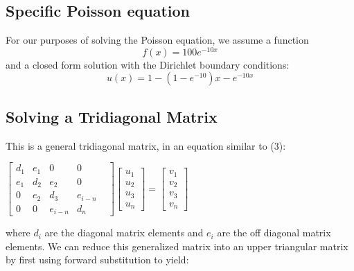 \documentclass[10pt,showpacs,preprintnumbers,footinbib,amsmath,amssymb,aps,prl,twocolumn,groupedaddress,superscriptaddress,showkeys]{revtex4-1}
\begin{document}
	\subsection{Specific Poisson equation}	
For our purposes of solving the Poisson equation, we assume a function \begin{equation}
	f(x)=100e^{-10x}
	\end{equation}
and a closed form solution with the Dirichlet boundary conditions:
	\begin{equation}
	u(x)=1-(1-e^{-10})x-e^{-10x}
	\end{equation}

	\subsection{Solving a Tridiagonal Matrix}
This is a general tridiagonal matrix, in an equation similar to (3):
	\begin{center}
		$\begin{bmatrix}
			d_{1}& e_{1} & 0 & 0 \\
			e_{1} & d_{2} & e_{2} & 0 & \\
			0 & e_{2} & d_{3} & e_{i-n}   \\
			0 & 0 & e_{i-n} & d_{n} 
	
		\end{bmatrix}
		 \begin{bmatrix}
			u_{1} \\
			u_{2} \\
			u_{3} \\
			u_{n} 
		\end{bmatrix} =
		\begin{bmatrix}
			v_{1} \\
			v_{2} \\
			v_{3} \\
			v_{n}
		\end{bmatrix}$
		\end{center}

where $d_{i}$ are the diagonal matrix elements and $e_{i}$ are the off diagonal matrix elements. We can reduce this generalized matrix into an upper triangular matrix by first using forward substitution to yield:
	
\end{document}
